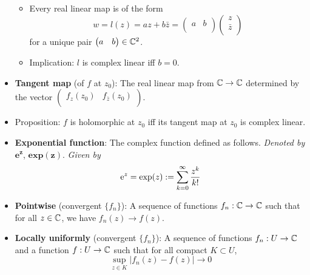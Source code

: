\documentclass[../notes.tex]{subfiles}
\begin{document}
\begin{itemize}
    \begin{itemize}
        \item Every real linear map is of the form
        \begin{equation*}
            w = l(z)
            = az+b\bar{z}
            =
            \begin{pmatrix}
                a & b\\
            \end{pmatrix}
            \begin{pmatrix}
                z\\
                \bar{z}\\
            \end{pmatrix}
        \end{equation*}
        for a unique pair $
            \begin{pmatrix}
                a & b\\
            \end{pmatrix}
            \in\C^2
        $.
        \item Implication: $l$ is complex linear iff $b=0$.
    \end{itemize}
    \item \textbf{Tangent map} (of $f$ at $z_0$): The real linear map from $\C\to\C$ determined by the vector $
        \begin{pmatrix}
            f_z(z_0) & f_{\bar{z}}(z_0)\\
        \end{pmatrix}
    $.
    \item Proposition: $f$ is holomorphic at $z_0$ iff its tangent map at $z_0$ is complex linear.
    \item \textbf{Exponential function}: The complex function defined as follows. \emph{Denoted by} $\textbf{e}^{\bm{z}}$, $\textbf{exp}\bm{(z)}$. \emph{Given by}
    \begin{equation*}
        \e[z] = \exp(z) := \sum_{k=0}^\infty\frac{z^k}{k!}
    \end{equation*}
    \item \textbf{Pointwise} (convergent $\{f_n\}$): A sequence of functions $f_n:\C\to\C$ such that for all $z\in\C$, we have $f_n(z)\to f(z)$.
    \item \textbf{Locally uniformly} (convergent $\{f_n\}$): A sequence of functions $f_n:U\to\C$ and a function $f:U\to\C$ such that for all compact $K\subset U$,
    \begin{equation*}
        \sup_{z\in K}|f_n(z)-f(z)| \to 0
    \end{equation*}

\end{itemize}
\end{document}
